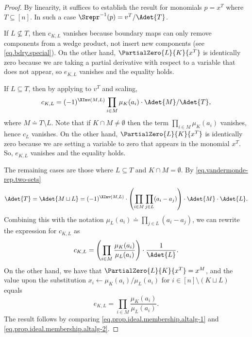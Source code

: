 \documentclass{toc}
\begin{document}
\begin{proof}
    By linearity, it suffices to establish the result for monomials $p=x^T$ where $T \subseteq [n]$. In such a case $\Srepr^{-1}(p)=v^T/\Adet{T}$. 

    If $L \not\subseteq T$, then $c_{K,L}$ vanishes because boundary maps can only remove components from a wedge product, not insert new components (see \eqref{eq.bdry.special}). On the other hand,  $\PartialZero{L}{K}{x^T}$ is identically zero because we are taking a partial derivative with respect to a variable that does not appear, so $e_{K,L}$ vanishes and the equality holds. 
    
    If $L \subseteq T$, then by applying  to $v^T$ and scaling, 
    \[ c_{K,L} = (-1)^{\XInv(M,L)} \prod_{i\in M} \mu_{K}(a_i)\cdot \Adet{M} / \Adet{T}, \]
    where $M \doteq T \setminus L$. 
    Note that if $K\cap M \ne \emptyset$ then the term $\prod_{i\in M} \mu_{K}(a_i)$ vanishes, hence $c_L$ vanishes. On the other hand, $\PartialZero{L}{K}{x^T}$ is identically zero because we are setting a variable to zero that appears in the monomial $x^T$. So, $e_{K,L}$ vanishes and the equality holds. 
    
    The remaining cases are those where $L \subseteq T$ and $K\cap M = \emptyset$. By \eqref{eq.vandermonde-rep.two-sets} 
    \[ \Adet{T} = \Adet{M \sqcup L} = (-1)^{\XInv(M,L)} \cdot \left( \prod_{i\in M}\prod_{j\in L}(a_i-a_j) \right) \cdot \Adet{M}\cdot \Adet{L}. \]
    Combining this with the notation $\mu_L(a_i) \doteq  \prod_{j\in L}(a_i-a_j)$, we can rewrite the expression for $c_{K,L}$ as
    \begin{equation}\label{eq.prop.ideal.membership.altalg-1}
    c_{K,L} = \left( \prod_{i\in M} \frac{\mu_K(a_i)}{\mu_L(a_i)}\right) \cdot \frac{1}{\Adet{L}}.
    \end{equation}
    On the other hand, we have that $\PartialZero{L}{K}{x^T} = x^M$, and the value upon the substitution $x_i\gets \mu_K(a_i)/\mu_L(a_i)$ for $i \in [n]\setminus (K \sqcup L)$ equals
    \begin{equation}\label{eq.prop.ideal.membership.altalg-2} e_{K,L} = \prod_{i\in M} \frac{\mu_K(a_i)}{\mu_L(a_i)}. 
    \end{equation}
    The result follows by comparing \eqref{eq.prop.ideal.membership.altalg-1} and \eqref{eq.prop.ideal.membership.altalg-2}. 
\end{proof}
\end{document}
